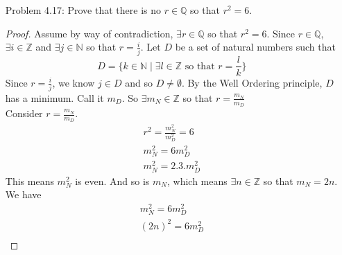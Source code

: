 \documentclass{article}
\theoremstyle{claim}
\theoremstyle{definition}
\begin{document}
\begin{enumerate}
        \begin{proof}
            We need to prove: If $\frac{m}{n}, \frac{p}{q} \in \mathbb{Q}$, then $\frac{m}{n} \cdot \frac{p}{q} = \frac{p}{q} \cdot \frac{m}{n}$.\\
            Assume $\frac{m}{n}, \frac{p}{q} \in \mathbb{Q}$, consider the expression
            \begin{align*}
                \frac{m}{n} \cdot \frac{p}{q} &= \frac{mp}{nq}\\
                &= \frac{pm}{nq} \text{ multiplication is commutative in } \mathbb{Z}\\
                &= \frac{pm}{qn} \text{ multiplication is commutative in } \mathbb{N}\\
                &= \frac{p}{q} \cdot \frac{m}{n}
            \end{align*}
            So multiplication is commutative in $\mathbb{Q}$.
        \end{proof}
    \item[Problem 4.17:] Prove that there is no $r \in \mathbb{Q}$ so that $r^2 = 6$.
        \begin{proof}
            Assume by way of contradiction, $\exists r \in \mathbb{Q}$ so that $r^2 = 6$. Since $r \in \mathbb{Q}$, $\exists i \in \mathbb{Z}$ and $\exists j \in \mathbb{N}$ so that $r = \frac{i}{j}$. Let $D$ be a set of natural numbers such that
            \begin{equation}
                D = \{k \in \mathbb{N} \mid \exists l \in \mathbb{Z} \text{ so that } r = \frac{l}{k}\}
            \end{equation}
            Since $r = \frac{i}{j}$, we know $j \in D$ and so $D \ne \emptyset$. By the Well Ordering principle, $D$ has a minimum. Call it $m_D$. So $\exists m_N \in \mathbb{Z}$ so that $r = \frac{m_N}{m_D}$ \\
            Consider $r = \frac{m_N}{m_D}$.
            \begin{gather*}
                r^2 = \frac{m_N^2}{m_D^2} = 6\\
                m_N^2 = 6m_D^2\\
                m_N^2 = 2.3.m_D^2
            \end{gather*}
            This means $m_N^2$ is even. And so is $m_N$, which means $\exists n \in \mathbb{Z}$ so that $m_N = 2n$.
            We have
            \begin{gather*}
                m_N^2 = 6m_D^2\\
                (2n)^2 = 6m_D^2\\

\end{gather*}
\end{proof}
\end{enumerate}
\end{document}
